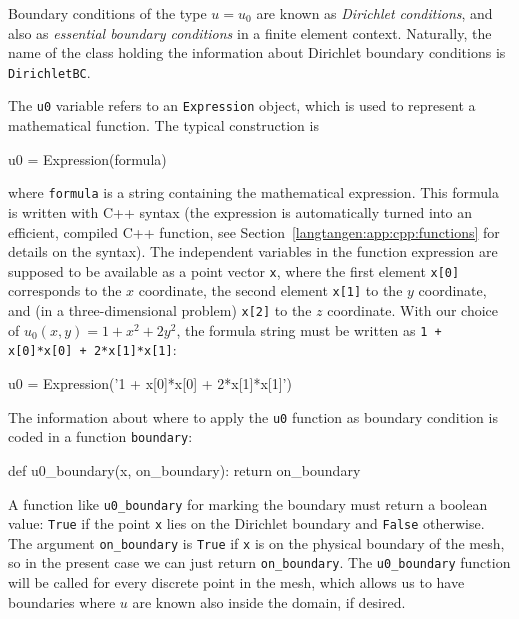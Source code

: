 Boundary conditions
of the type $u=u_0$ are known as \emph{Dirichlet conditions}, and also
as \emph{essential boundary conditions} in a finite element context.
Naturally, the name of the \dolfin{} class holding the information about
Dirichlet boundary conditions is {\fontsize{10pt}{10pt}\texttt{DirichletBC}}.

The {\fontsize{10pt}{10pt}\verb!u0!} variable refers to an {\fontsize{10pt}{10pt}\verb!Expression!} object, which
is used to represent a mathematical function. The typical construction is
\begin{python}
u0 = Expression(formula)
\end{python}
where {\fontsize{10pt}{10pt}\verb!formula!} is a string containing the mathematical expression.
This formula is
written with C++ syntax (the expression is 
automatically turned into an efficient, compiled
C++ function, see Section~\ref{langtangen:app:cpp:functions} for
details on the syntax). The independent variables in the function
expression are supposed to be available
as a point vector {\fontsize{10pt}{10pt}\verb!x!}, where the first element {\fontsize{10pt}{10pt}\verb!x[0]!}
corresponds to the $x$ coordinate, the second element {\fontsize{10pt}{10pt}\verb!x[1]!}
to the $y$ coordinate, and (in a three-dimensional problem)
{\fontsize{10pt}{10pt}\verb!x[2]!} to the $z$ coordinate. With our choice of
$u_0(x,y)=1 + x^2 + 2y^2$, the formula string must be written
as {\fontsize{10pt}{10pt}\verb!1 + x[0]*x[0] + 2*x[1]*x[1]!}:
\begin{python}
u0 = Expression('1 + x[0]*x[0] + 2*x[1]*x[1]')
\end{python}

The information about where to apply the {\fontsize{10pt}{10pt}\verb!u0!} function as
boundary condition is coded in a function {\fontsize{10pt}{10pt}\texttt{boundary}}:
\begin{python}
def u0_boundary(x, on_boundary):
    return on_boundary
\end{python}
A function like {\fontsize{10pt}{10pt}\verb!u0_boundary!} for marking the boundary must
return
a boolean value: {\fontsize{10pt}{10pt}\verb!True!} if the point
{\fontsize{10pt}{10pt}\verb!x!} lies on the Dirichlet boundary and 
{\fontsize{10pt}{10pt}\verb!False!} otherwise.
The argument {\fontsize{10pt}{10pt}\verb!on_boundary!} is {\fontsize{10pt}{10pt}\verb!True!} if {\fontsize{10pt}{10pt}\verb!x!} is on
the physical boundary of the mesh, so in the present case we can just return
{\fontsize{10pt}{10pt}\verb!on_boundary!}. 
The {\fontsize{10pt}{10pt}\verb!u0_boundary!} function will be called
for every discrete point in the mesh, which allows us to have boundaries
where $u$ are known also inside the domain, if desired.

